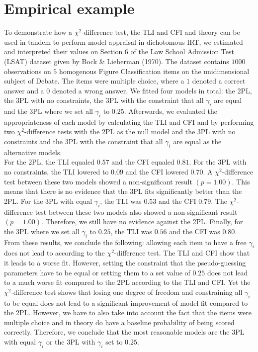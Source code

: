 \documentclass[Royal,sageapa,times,doublespace]{sagej}
\begin{document}
\section{Empirical example}
To demonstrate how a $\chi^2$-difference test, the TLI and CFI and theory can be used in tandem to perform model appraisal in dichotomous IRT, we estimated and interpreted their values on Section 6 of the Law School Admission Test (LSAT) dataset given by Bock \& Lieberman (1970). The dataset contains $1000$ observations on $5$ homogenous Figure Classification items on the unidimensional subject of Debate. The items were multiple choice, where a $1$ denoted a correct answer and a $0$ denoted a wrong answer. We fitted four models in total: the 2PL, the 3PL with no constraints, the 3PL with the constraint that all $\gamma_i$ are equal and the 3PL where we set all $\gamma_i$ to $0.25$. Afterwards, we evaluated the appropriateness of each model by calculating the TLI and CFI and by performing two $\chi^2$-difference tests with the 2PL as the null model and the 3PL with no constraints and the 3PL with the constraint that all $\gamma_i$ are equal as the alternative models. \\
\indent For the 2PL, the TLI equaled $0.57$ and the CFI equaled $0.81$. For the 3PL with no constraints, the TLI lowered to $0.09$ and the CFI lowered $0.70$. A $\chi^2$-difference test between these two models showed a non-significant result $(p = 1.00)$. This means that there is no evidence that the 3PL fits significantly better than the 2PL. For the 3PL with equal $\gamma_i$, the TLI was $0.53$ and the CFI $0.79$. The $\chi^2$-difference test between these two models also showed a non-significant result $(p = 1.00)$. Therefore, we still have no evidence against the 2PL. Finally, for the 3PL where we set all $\gamma_i$ to $0.25$, the TLI was $0.56$ and the CFI was $0.80$. \\
\indent From these results, we conclude the following: allowing each item to have a free $\gamma_i$ does not lead to according to the $\chi^2$-difference test. The TLI and CFI show that it leads to a worse fit. However, setting the constraint that the pseudo-guessing parameters have to be equal or setting them to a set value of $0.25$ does not lead to a much worse fit compared to the 2PL according to the TLI and CFI. Yet the $\chi^2$-difference test shows that losing one degree of freedom and constraining all $\gamma_i$ to be equal does not lead to a significant improvement of model fit compared to the 2PL. However, we have to also take into account the fact that the items were multiple choice and in theory do have a baseline probability of being scored correctly. Therefore, we conclude that the most reasonable models are the 3PL with equal $\gamma_i$ or the 3PL with $\gamma_i$ set to $0.25$.
\end{document}
